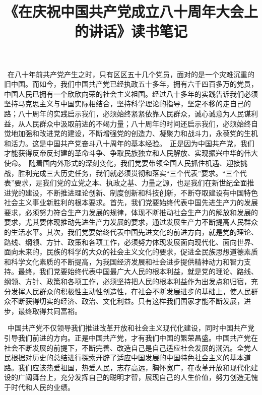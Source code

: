\documentclass[UTF-8, a4paper]{ctexart}
\title{《在庆祝中国共产党成立八十周年大会上的讲话》读书笔记}
\author{}
\date{}
\begin{document}
	\maketitle
	 在八十年前共产党产生之时，只有区区五十几个党员，面对的是一个灾难沉重的旧中国。而如今，我们中国共产党已经执政五十多年，拥有六千四百多万的党员，中国人民已拥有一个欣欣向荣的社会主义祖国。经过八十多年的实践告诉我们必须坚持马克思主义与中国实际相结合，坚持科学理论的指导，坚定不移的走自己的路；八十周年的实践启示我们，必须始终紧紧依靠人民群众，诚心诚意为人民谋利益，从人民群众中汲取前进的不竭力量；八十周年的时间还启示我们，必须始终自觉地加强和改进党的建设，不断增强党的创造力、凝聚力和战斗力，永葆党的生机和活力。这是中国共产党奋斗八十周年的基本经验。 正是因为中国共产党，我们才能获得反帝反封建的革命斗争、争取民族独立和人民解放、实现振兴中华的伟大使命。 随着国内外形式的深刻变化，我们党要带领全国人民抓住机遇、迎接挑战，胜利完成三大历史任务，我们就必须贯彻和落实“三个代表”要求。“三个代表”要求，是我们党的立党之本、执政之基、力量之源，也是我们在新世纪全面推进党的建设，不断推进理论创新、制度创新和科技创新，不断夺取建设有中国特色社会主义事业新胜利的根本要求。首先，我们党要始终代表中国先进生产力的发展要求，必须努力符合生产力发展的规律，体现不断推动社会生产力的解放和发展的要求，尤其要体现推动先进生产力发展的要求，通过发展生产力不断提高人民群众的生活水平。其次，我们党要始终代表中国先进文化的前进方向，就是党的理论、路线、纲领、方针、政策和各项工作，必须努力体现发展面向现代化、面向世界、面向未来的，民族的科学的大众的社会主义文化的要求，促进全民族思想道德素质和科学文化素质的不断提高，为我国经济发展和社会进步提供精神动力和智力支持。最终，我们党要始终代表中国最广大人民的根本利益，就是党的理论、路线、纲领、方针、政策和各项工作，必须坚持把人民的根本利益作为出发点和归宿，充分发挥人民群众的积极性主动性创造性，在社会不断发展进步的基础上，使人民群众不断获得切实的经济、政治、文化利益。只有这样我们国家才能不断发展，进步，最终取得共同富裕。 
	
	 中国共产党不仅领导我们推进改革开放和社会主义现代化建设，同时中国共产党引导我们前进的方向。正是中国共产党，才有我们中国的繁荣昌盛。中国共产党在社会不断发展的前提下，不断完善、改造自己是自己适应社会发展的潮流。全党人民根据对历史的总结进行探索开辟了适应中国发展的中国特色社会主义的基本道路。我们应该热爱祖国，热爱人民，志存高远，胸怀宽广，在改革开放和现代化建设的广阔舞台上，充分发挥自己的聪明才智，展现自己的人生价值，努力创造无愧于时代和人民的业绩。
	 
	 
	
\end{document}
